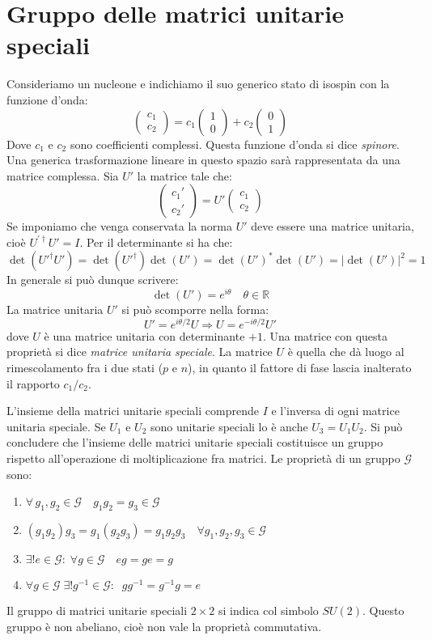 \section{Gruppo delle matrici unitarie speciali}
Consideriamo un nucleone e indichiamo il suo generico stato di isospin con la 
funzione d'onda:
\[
\begin{pmatrix}
c_1\\
c_2
\end{pmatrix}
=c_1
\begin{pmatrix}
1\\
0
\end{pmatrix}
+c_2
\begin{pmatrix}
0\\
1
\end{pmatrix}
\]
Dove $c_1$ e $c_2$ sono coefficienti complessi. Questa funzione d'onda si dice
\textit{spinore}. Una generica trasformazione lineare in questo spazio sarà
rappresentata da una matrice complessa.
Sia $U'$ la matrice tale che:
\[
\begin{pmatrix}
c_1'\\
c_2'
\end{pmatrix}
=U'
\begin{pmatrix}
c_1\\
c_2
\end{pmatrix}
\]
Se imponiamo che venga conservata la norma $U'$ deve essere una matrice
unitaria, cioè $U^{'\dagger}U'=I$.
Per il determinante si ha che:
\[
\det(U'^{\dagger}U')=\det(U'^{\dagger})\det(U')=\det(U')^*\det(U')=|\det(U')|^2=
1
\]
In generale si può dunque scrivere:
\[
\det(U')=e^{i\theta}\quad\theta\in\mathbb{R}
\]
La matrice unitaria $U'$ si può scomporre nella forma:
\begin{equation}
U'=e^{i\theta/2}U\Rightarrow U=e^{-i\theta/2}U'
\end{equation}
dove $U$ è una matrice unitaria con determinante $+1$. Una matrice con questa
proprietà si dice \textit{matrice unitaria speciale}.
La matrice $U$ è quella che dà luogo al rimescolamento fra i due stati ($p$ e
$n$), in quanto il fattore di fase lascia inalterato il rapporto $c_1/c_2$.

L'insieme della matrici unitarie speciali comprende $I$ e l'inversa di ogni
matrice unitaria speciale. Se $U_1$ e $U_2$ sono unitarie speciali lo è anche
$U_3=U_1U_2$.
Si può concludere che l'insieme delle matrici unitarie speciali costituisce un
gruppo rispetto all'operazione di moltiplicazione fra matrici. Le proprietà di
un gruppo $\mathscr{G}$ sono:
\begin{enumerate}
\item $\forall\,g_1,g_2\in\mathscr{G}\quad g_1g_2=g_3\in\mathscr{G}$
\item $(g_1g_2)g_3=g_1(g_2g_3)=g_1g_2g_3\quad\forall g_1,g_2,g_3\in\mathscr{G}$
\item $\exists !e\in\mathscr{G}:\;\forall g\in\mathscr{G}\quad eg=ge=g$
\item $\forall g\in\mathscr{G}\;\exists 
!g^{-1}\in\mathscr{G}:\;\;gg^{-1}=g^{-1}g=e$
\end{enumerate}
Il gruppo di matrici unitarie speciali $2\times 2$ si indica col simbolo
$SU(2)$. Questo gruppo è non abeliano, cioè non vale la proprietà 
commutativa.

